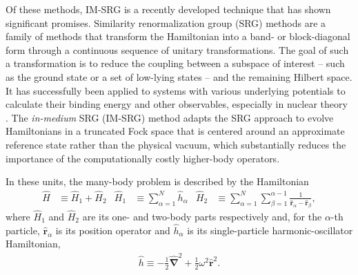 \documentclass[thesis.tex]{subfiles}
\begin{document}
Of these methods, IM-SRG is a recently developed technique that has shown significant promises.  Similarity renormalization group (SRG) methods \cite{PhysRevD.48.5863,PhysRevD.49.4214} are a family of methods that transform the Hamiltonian into a band- or block-diagonal form through a continuous sequence of unitary transformations.  The goal of such a transformation is to reduce the coupling between a subspace of interest -- such as the ground state or a set of low-lying states -- and the remaining Hilbert space.  It has successfully been applied to systems with various underlying potentials to calculate their binding energy and other observables, especially in nuclear theory \cite{ScottSRG,PhysRevC.75.061001,SRGThreeDim}.  The \emph{in-medium} SRG (IM-SRG) method adapts the SRG approach to evolve Hamiltonians in a truncated Fock space that is centered around an approximate reference state rather than the physical vacuum, which substantially reduces the importance of the computationally costly higher-body operators.



In these units, the many-body problem is described by the Hamiltonian
\begin{align} \label{eq:fullhamiltonian}
  \hat H &\equiv \hat{H}_1 + \hat{H}_2 & \hat{H}_1 &\equiv \sum_{\alpha = 1}^N \hat{h}_\alpha & \hat{H}_2 &\equiv \sum_{\alpha = 1}^N \sum_{\beta = 1}^{\alpha - 1} \frac{1}{\hat{\bm r}_\alpha - \hat{\bm r}_\beta},
\end{align}
where $\hat{H}_1$ and $\hat{H}_2$ are its one- and two-body parts respectively and, for the $\alpha$-th particle, $\hat{\bm r}_\alpha$ is its position operator and  $\hat{h}_\alpha$ is its single-particle harmonic-oscillator Hamiltonian,
\begin{align*}
  \hat{h} \equiv -\frac{1}{2} \hat{\bm{\nabla}}^2 + \frac{1}{2} \omega^2 \hat{\bm{r}}^2.
\end{align*}
\end{document}
